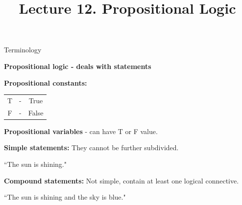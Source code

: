 \documentclass[aspectratio=169]{beamer}
\title{Lecture 12. Propositional Logic}
\date{}
\begin{document}
\frame[plain]{\titlepage}


\begin{frame}[plain]{Terminology}
 
 {\bf Propositional logic - deals with statements}
 \medskip
 
 {\bf Propositional constants:}
 
   \begin{center}
    \begin{tabular}{ccc}
      T &-& True \\
      F &- & False
    \end{tabular}
   \end{center}

   {\bf Propositional variables} - can have T or F value.
  \medskip
  
  {\bf Simple statements:} They cannot be further subdivided.
 
    \begin{center} 
     ``The sun is shining."
    \end{center}
    
    \medskip
    
 {\bf Compound statements:} Not simple, contain at least one logical connective.
 \smallskip
 
 \begin{center}
   ``The sun is shining and the sky is blue."
 \end{center} 
  
 
\end{frame}
\end{document}
